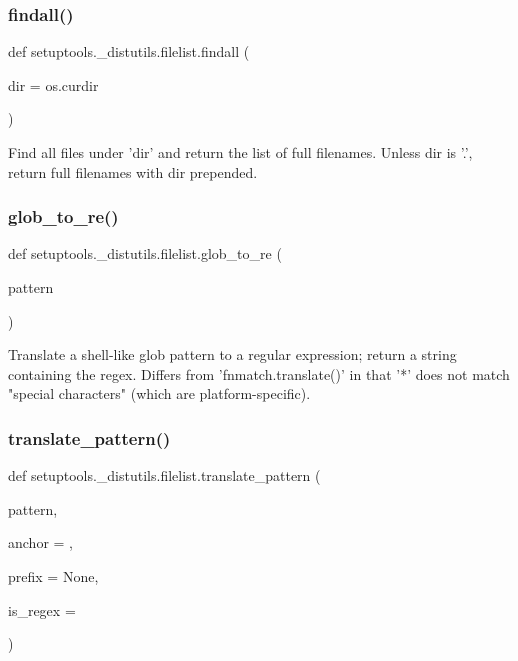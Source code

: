 \subsubsection{\texorpdfstring{findall()}{findall()}}
{\footnotesize\ttfamily def setuptools.\+\_\+distutils.\+filelist.\+findall (\begin{DoxyParamCaption}\item[{}]{dir = {\ttfamily os.curdir} }\end{DoxyParamCaption})}

\begin{DoxyVerb}Find all files under 'dir' and return the list of full filenames.
Unless dir is '.', return full filenames with dir prepended.
\end{DoxyVerb}
 \mbox{\label{namespacesetuptools_1_1__distutils_1_1filelist_ac6e5afc60b358dace671a325a9bcc2a6}} 
\subsubsection{\texorpdfstring{glob\+\_\+to\+\_\+re()}{glob\_to\_re()}}
{\footnotesize\ttfamily def setuptools.\+\_\+distutils.\+filelist.\+glob\+\_\+to\+\_\+re (\begin{DoxyParamCaption}\item[{}]{pattern }\end{DoxyParamCaption})}

\begin{DoxyVerb}Translate a shell-like glob pattern to a regular expression; return
a string containing the regex.  Differs from 'fnmatch.translate()' in
that '*' does not match "special characters" (which are
platform-specific).
\end{DoxyVerb}
 \mbox{\label{namespacesetuptools_1_1__distutils_1_1filelist_abf11e021b1df18cc8d81a188f43ae2a2}} 
\subsubsection{\texorpdfstring{translate\+\_\+pattern()}{translate\_pattern()}}
{\footnotesize\ttfamily def setuptools.\+\_\+distutils.\+filelist.\+translate\+\_\+pattern (\begin{DoxyParamCaption}\item[{}]{pattern,  }\item[{}]{anchor = {},  }\item[{}]{prefix = {\ttfamily None},  }\item[{}]{is\+\_\+regex = {} }\end{DoxyParamCaption})}

